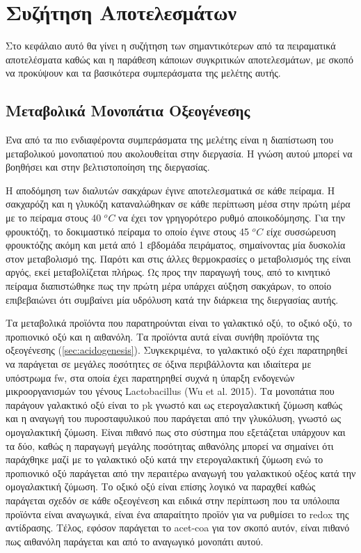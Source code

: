 \documentclass[11pt]{report}
\makeatletter
\newcommand{\citeprocitem}[2]{\hyper@linkstart{cite}{citeproc_bib_item_#1}#2\hyper@linkend}
\makeatother
\begin{document}
\chapter{Συζήτηση Αποτελεσμάτων}
\label{sec:orgae9fd52}
\label{sec:result_discussion}

Στο κεφάλαιο αυτό θα γίνει η συζήτηση των σημαντικότερων από τα πειραματικά αποτελέσματα καθώς και η παράθεση κάποιων συγκριτικών αποτελεσμάτων, με σκοπό να προκύψουν και τα βασικότερα συμπεράσματα της μελέτης αυτής.

\section{Μεταβολικά Μονοπάτια Οξεογένεσης}
\label{sec:org61ca7f1}
Ένα από τα πιο ενδιαφέροντα συμπεράσματα της μελέτης είναι η διαπίστωση του μεταβολικού μονοπατιού που ακολουθείται στην διεργασία. Η γνώση αυτού μπορεί να βοηθήσει και στην βελτιστοποίηση της διεργασίας.

Η αποδόμηση των διαλυτών σακχάρων έγινε αποτελεσματικά σε κάθε πείραμα. Η σακχαρόζη και η γλυκόζη καταναλώθηκαν σε κάθε περίπτωση μέσα στην πρώτη μέρα με το πείραμα στους 40 \(^oC\) να έχει τον γρηγορότερο ρυθμό αποικοδόμησης. Για την φρουκτόζη, το δοκιμαστικό πείραμα το οποίο έγινε στους 45 \(^oC\) είχε συσσώρευση φρουκτόζης ακόμη και μετά από 1 εβδομάδα πειράματος, σημαίνοντας μία δυσκολία στον μεταβολισμό της. Παρότι και στις άλλες θερμοκρασίες ο μεταβολισμός της είναι αργός, εκεί μεταβολίζεται πλήρως. Ως προς την παραγωγή τους, από το κινητικό πείραμα διαπιστώθηκε πως την πρώτη μέρα υπάρχει αύξηση σακχάρων, το οποίο επιβεβαιώνει ότι συμβαίνει μία υδρόλυση κατά την διάρκεια της διεργασίας αυτής.

Τα μεταβολικά προϊόντα που παρατηρούνται είναι το γαλακτικό οξύ, το οξικό οξύ, το προπιονικό οξύ και η αιθανόλη. Τα προϊόντα αυτά είναι συνήθη προϊόντα της οξεογένεσης (\autoref{sec:acidogenesis}). Συγκεκριμένα, το γαλακτικό οξύ έχει παρατηρηθεί να παράγεται σε μεγάλες ποσότητες σε όξινα περιβάλλοντα και ιδιαίτερα με υπόστρωμα \acrshort{fw}, στα οποία έχει παρατηρηθεί συχνά η ύπαρξη ενδογενών μικροοργανισμών του γένους Lactobacillus (\citeprocitem{87}{Wu et al. 2015}). Τα μονοπάτια που παράγουν γαλακτικό οξύ είναι το \acrfull{pk} γνωστό και ως ετερογαλακτική ζύμωση καθώς και η αναγωγή του πυροσταφυλικού που παράγεται από την γλυκόλυση, γνωστό ως ομογαλακτική ζύμωση. Είναι πιθανό πως στο σύστημα που εξετάζεται υπάρχουν και τα δύο, καθώς η παραγωγή μεγάλης ποσότητας αιθανόλης μπορεί να σημαίνει ότι παράχθηκε μαζί με το γαλακτικό οξύ κατά την ετερογαλακτική ζύμωση ενώ το προπιονικό οξύ παράγεται από την περαιτέρω αναγωγή του γαλακτικού οξέος κατά την ομογαλακτική ζύμωση. Το οξικό οξύ είναι επίσης λογικό να παραχθεί καθώς παράγεται σχεδόν σε κάθε οξεογένεση και ειδικά στην περίπτωση που τα υπόλοιπα προϊόντα είναι αναγωγικά, είναι ένα απαραίτητο προϊόν για να ρυθμίσει το \acrfull{redox} της αντίδρασης. Τέλος, εφόσον παράγεται το \acrshort{acet-coa} για τον σκοπό αυτόν, είναι πιθανό πως αιθανόλη παράγεται και από το αναγωγικό μονοπάτι αυτού.
\end{document}
